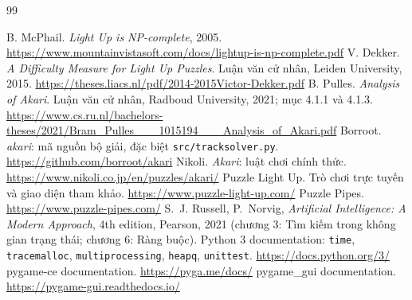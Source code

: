 \documentclass[12pt,a4paper]{article}
\renewcommand{\code}[1]{\texttt{#1}}
\begin{document}

\clearpage
\begin{thebibliography}{99}
\raggedright
{}
 B. McPhail. \emph{Light Up is NP-complete}, 2005.
\url{https://www.mountainvistasoft.com/docs/lightup-is-np-complete.pdf}
 V. Dekker. \emph{A Difficulty Measure for Light Up Puzzles}.
Luận văn cử nhân, Leiden University, 2015.
\url{https://theses.liacs.nl/pdf/2014-2015Victor-Dekker.pdf}
 B. Pulles. \emph{Analysis of Akari}.
Luận văn cử nhân, Radboud University, 2021; mục 4.1.1 và 4.1.3.
\url{https://www.cs.ru.nl/bachelors-theses/2021/Bram_Pulles___1015194___Analysis_of_Akari.pdf}
 Borroot. \emph{akari}: mã nguồn bộ giải,
đặc biệt \code{src/tracksolver.py}.
\url{https://github.com/borroot/akari}
 Nikoli. \emph{Akari}: luật chơi chính thức.
\url{https://www.nikoli.co.jp/en/puzzles/akari/}
 Puzzle Light Up. Trò chơi trực tuyến và giao diện tham khảo.
\url{https://www.puzzle-light-up.com/}
 Puzzle Pipes. \url{https://www.puzzle-pipes.com/}
 S.~J. Russell, P.~Norvig, \emph{Artificial Intelligence: A Modern
Approach}, 4th edition, Pearson, 2021 (chương 3: Tìm kiếm trong không gian
trạng thái; chương 6: Ràng buộc).
 Python 3 documentation: \code{time}, \code{tracemalloc},
\code{multiprocessing}, \code{heapq}, \code{unittest}.
\url{https://docs.python.org/3/}
 pygame-ce documentation. \url{https://pyga.me/docs/}
\quad pygame\_gui documentation. \url{https://pygame-gui.readthedocs.io/}
\end{thebibliography}
\end{document}
